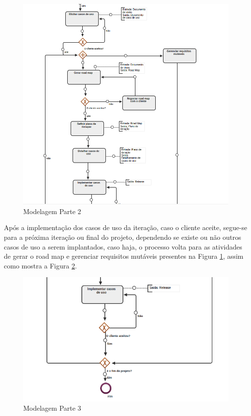 \begin{figure}[H]
	\centering
	\includegraphics[width=1\textwidth]{imgModelagem/modelagem2}
	\caption{Modelagem Parte 2}
	\label{img:modelagem2}
\end{figure}

Após a implementação dos casos de uso da iteração, caso o cliente aceite, segue-se para a próxima iteração ou final do projeto, dependendo se existe ou não outros casos de uso a serem implantados, caso haja, o processo volta para as atividades de gerar o road map  e gerenciar requisitos mutáveis presentes na Figura \ref{img:modelagem2}, assim como mostra a Figura \ref{img:modelagem3}.

\begin{figure}[H]
	\centering
	\includegraphics[width=1\textwidth]{imgModelagem/modelagem3}
	\caption{Modelagem Parte 3}
	\label{img:modelagem3}
\end{figure}
